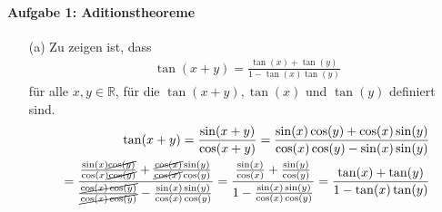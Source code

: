 	\paragraph{Aufgabe 1: Aditionstheoreme}
	\begin{itemize}
		\item[(a)] Zu zeigen ist, dass
		\begin{align*}
			\tan( x + y ) = \frac{ \tan( x ) + \tan( y ) }{ 1 - \tan( x ) \tan( y )}
		\end{align*}
		für alle $ x, y \in \mathbb{R} $, für die $ \tan( x + y ), \tan( x ) $ und $ \tan( y )$ definiert sind.
		\begin{align*}
			\tan( x + y ) 
			= \frac{ \sin( x + y ) }{ \cos( x + y ) } 
			= \frac{ \sin( x ) \cos( y ) + \cos( x ) \sin( y ) }
			{ \cos( x ) \cos( y ) - \sin( x ) \sin( y ) }
			\\
			= \frac{ \frac{ \sin( x ) \cancel{ \cos( y ) } }{ \cos( x ) \cancel{ \cos( y ) } } + \frac{ \cancel{ \cos( x ) } \sin( y ) }{ \cancel{ \cos( x ) } \cos( y ) } }
				{ \frac{ \cancel{ \cos( x )  \cos( y ) } }{ \cancel{ \cos( x ) \cos( y ) } } - \frac{ \sin( x ) \sin( y ) }{ \cos( x ) \cos( y ) } }
			= \frac{ \frac{ \sin( x )}{ \cos( x ) } + \frac{ \sin( y ) }{ \cos( y ) } }
				{ 1 - \frac{ \sin( x ) \sin( y ) }{ \cos( x ) \cos( y ) } } 
			= \frac{ \tan( x ) + \tan( y ) }{ 1 - \tan( x ) \tan( y ) }
		\end{align*}
		

\end{itemize}
